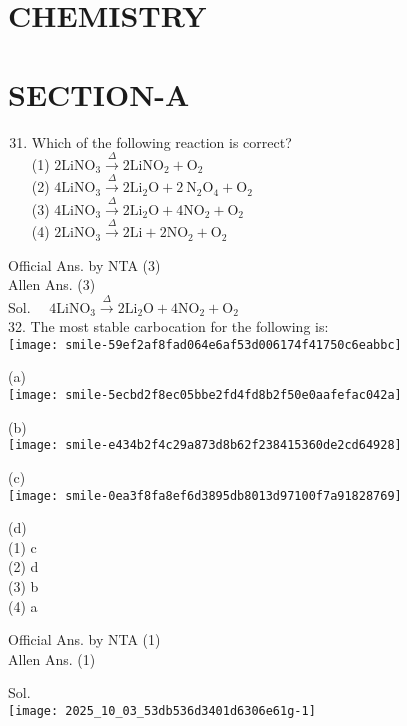 \documentclass[10pt]{article}
\begin{document}
\section*{CHEMISTRY}
\section*{SECTION-A}
\begin{enumerate}
  \setcounter{enumi}{30}
  \item Which of the following reaction is correct?\\
(1) \(2 \mathrm{LiNO}_{3} \xrightarrow{\Delta} 2 \mathrm{LiNO}_{2}+\mathrm{O}_{2}\)\\
(2) \(4 \mathrm{LiNO}_{3} \xrightarrow{\Delta} 2 \mathrm{Li}_{2} \mathrm{O}+2 \mathrm{~N}_{2} \mathrm{O}_{4}+\mathrm{O}_{2}\)\\
(3) \(4 \mathrm{LiNO}_{3} \xrightarrow{\Delta} 2 \mathrm{Li}_{2} \mathrm{O}+4 \mathrm{NO}_{2}+\mathrm{O}_{2}\)\\
(4) \(2 \mathrm{LiNO}_{3} \xrightarrow{\Delta} 2 \mathrm{Li}+2 \mathrm{NO}_{2}+\mathrm{O}_{2}\)
\end{enumerate}

Official Ans. by NTA (3)\\
Allen Ans. (3)\\
Sol. \(\quad 4 \mathrm{LiNO}_{3} \xrightarrow{\Delta} 2 \mathrm{Li}_{2} \mathrm{O}+4 \mathrm{NO}_{2}+\mathrm{O}_{2}\)\\
32. The most stable carbocation for the following is:\\
\texttt{[image: smile-59ef2af8fad064e6af53d006174f41750c6eabbc]}

(a)\\
\texttt{[image: smile-5ecbd2f8ec05bbe2fd4fd8b2f50e0aafefac042a]}

(b)\\
\texttt{[image: smile-e434b2f4c29a873d8b62f238415360de2cd64928]}

(c)\\
\texttt{[image: smile-0ea3f8fa8ef6d3895db8013d97100f7a91828769]}

(d)\\
(1) c\\
(2) d\\
(3) b\\
(4) a

Official Ans. by NTA (1)\\
Allen Ans. (1)

Sol.\\
\texttt{[image: 2025\_10\_03\_53db536d3401d6306e61g-1]}
\end{document}
